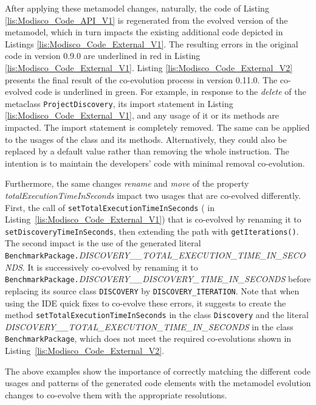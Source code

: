 After applying these metamodel changes, naturally, the code of Listing \ref{lis:Modisco_Code_API_V1} is regenerated from the evolved version of the metamodel, which in turn impacts the existing additional code depicted in Listings \ref{lis:Modisco_Code_External_V1}. 
The resulting errors in the original code in version 0.9.0 are underlined in red in Listing \ref{lis:Modisco_Code_External_V1}. 
Listing \ref{lis:Modisco_Code_External_V2} presents the final result of the co-evolution process in version 0.11.0. The co-evolved code is underlined in green. 
For example, in response to the \textit{delete} of the metaclass \texttt{ProjectDiscovery}, its import statement {\small{}} in Listing \ref{lis:Modisco_Code_External_V1}, and any usage of it or its methods are impacted. The import statement is completely removed. The same can be applied to the usages of the class and its methods. Alternatively, they could also be replaced by a default value rather than removing the whole instruction. The intention is to maintain the developers' code with minimal removal co-evolution. 

Furthermore, the same changes \textit{rename} and \textit{move} of the property \emph{totalExecutionTimeInSeconds} impact two usages that are co-evolved differently. First, the call of \texttt{setTotalExecutionTimeInSeconds} ({\small{}} in Listing~\ref{lis:Modisco_Code_External_V1}) that is co-evolved by renaming it to \texttt{setDiscoveryTimeInSeconds}, then extending the path with \texttt{getIterations()}. The second impact is the use of the generated literal \texttt{BenchmarkPackage.}\emph{\footnotesize{DISCOVERY\_\_TOTAL\_EXECUTION\_TIME\_IN\_SECONDS}}. It is successively co-evolved by renaming it to \texttt{BenchmarkPackage.}\emph{\footnotesize{DISCOVERY\_\_DISCOVERY\_TIME\_IN\_SECONDS}} before replacing its source class \texttt{DISCOVERY} by \texttt{DISCOVERY\_ITERATION}. 
Note that when using the IDE quick fixes to co-evolve these errors, it suggests to create the method \texttt{setTotalExecutionTimeInSeconds} in the class \texttt{Discovery} and the literal \emph{\footnotesize{DISCOVERY\_\_TOTAL\_EXECUTION\_TIME\_IN\_SECONDS}} in the class \texttt{BenchmarkPackage}, which does not meet the required co-evolutions shown in Listing~\ref{lis:Modisco_Code_External_V2}.

The above examples show the importance of correctly matching the different code usages and patterns of the generated code elements with the metamodel evolution changes to co-evolve them with the appropriate resolutions. 

